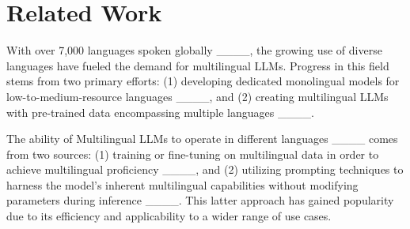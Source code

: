 \section{Related Work}

With over 7,000 languages spoken globally ____,   the growing use of diverse languages have fueled the demand for multilingual LLMs. Progress in this field stems from two primary efforts: (1) developing dedicated monolingual models for low-to-medium-resource languages ____, and (2) creating multilingual LLMs with pre-trained data encompassing multiple languages  ____. 

The ability of Multilingual LLMs to operate in %
different languages  ____ comes from two sources: (1)  training or fine-tuning on multilingual data in order to achieve multilingual proficiency
____, and (2) utilizing prompting techniques to harness the model's inherent multilingual capabilities without modifying parameters during inference ____. This latter approach has gained popularity due to its efficiency and applicability to a wider range of use cases.








